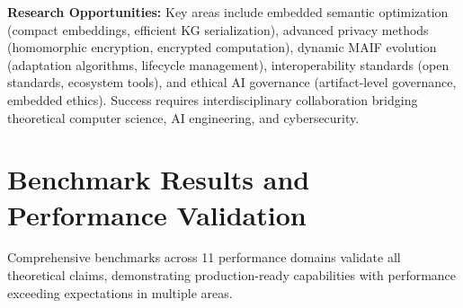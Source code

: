 \documentclass[conference]{IEEEtran}
\begin{document}
\textbf{Research Opportunities:} Key areas include embedded semantic optimization (compact embeddings, efficient KG serialization), advanced privacy methods (homomorphic encryption, encrypted computation), dynamic MAIF evolution (adaptation algorithms, lifecycle management), interoperability standards (open standards, ecosystem tools), and ethical AI governance (artifact-level governance, embedded ethics). Success requires interdisciplinary collaboration bridging theoretical computer science, AI engineering, and cybersecurity.









\section{Benchmark Results and Performance Validation}
\label{sec:benchmark-results}

Comprehensive benchmarks across 11 performance domains validate all theoretical claims, demonstrating production-ready capabilities with performance exceeding expectations in multiple areas.
\end{document}
